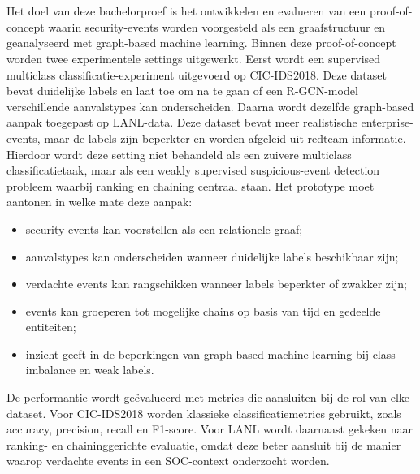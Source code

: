 \section{}%
\label{sec:onderzoeksdoelstelling}

Het doel van deze bachelorproef is het ontwikkelen en evalueren van een proof-of-concept waarin security-events worden voorgesteld als een graafstructuur en geanalyseerd met graph-based machine learning.
\newline
\newline
Binnen deze proof-of-concept worden twee experimentele settings uitgewerkt. Eerst wordt een supervised multiclass classificatie-experiment uitgevoerd op CIC-IDS2018. Deze dataset bevat duidelijke labels en laat toe om na te gaan of een R-GCN-model verschillende aanvalstypes kan onderscheiden.
\newline
\newline
Daarna wordt dezelfde graph-based aanpak toegepast op LANL-data. Deze dataset bevat meer realistische enterprise-events, maar de labels zijn beperkter en worden afgeleid uit redteam-informatie. Hierdoor wordt deze setting niet behandeld als een zuivere multiclass classificatietaak, maar als een weakly supervised suspicious-event detection probleem waarbij ranking en chaining centraal staan.
\newline
\newline
Het prototype moet aantonen in welke mate deze aanpak:
\begin{itemize}
    \item security-events kan voorstellen als een relationele graaf;
    \item aanvalstypes kan onderscheiden wanneer duidelijke labels beschikbaar zijn;
    \item verdachte events kan rangschikken wanneer labels beperkter of zwakker zijn;
    \item events kan groeperen tot mogelijke chains op basis van tijd en gedeelde entiteiten;
    \item inzicht geeft in de beperkingen van graph-based machine learning bij class imbalance en weak labels.
\end{itemize}

De performantie wordt geëvalueerd met metrics die aansluiten bij de rol van elke dataset. Voor CIC-IDS2018 worden klassieke classificatiemetrics gebruikt, zoals accuracy, precision, recall en F1-score. Voor LANL wordt daarnaast gekeken naar ranking- en chaininggerichte evaluatie, omdat deze beter aansluit bij de manier waarop verdachte events in een SOC-context onderzocht worden.

